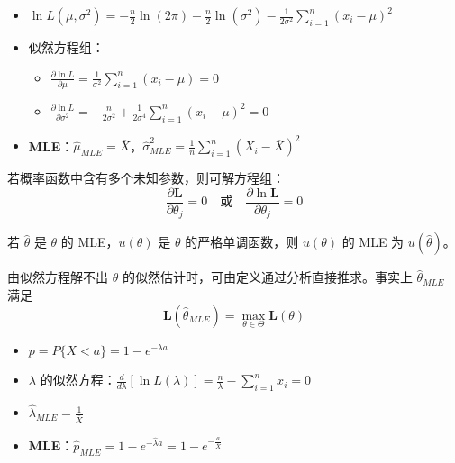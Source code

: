 \begin{example}
\begin{itemize}
	\item $\ln L(\mu, \sigma^2) = -\frac{n}{2}\ln(2\pi) - \frac{n}{2}\ln(\sigma^{2}) - \frac{1}{2\sigma^{2}}\sum_{i=1}^{n}(x_{i}-\mu)^{2}$
	\item 似然方程组：
	\begin{itemize}
		\item $\frac{\partial \ln L}{\partial \mu} = \frac{1}{\sigma^{2}}\sum_{i=1}^{n}(x_{i}-\mu) = 0$
		\item $\frac{\partial \ln L}{\partial \sigma^{2}} = -\frac{n}{2\sigma^{2}} + \frac{1}{2\sigma^{4}}\sum_{i=1}^{n}(x_{i}-\mu)^{2} = 0$
	\end{itemize}
	\item \textbf{MLE}：$\hat{\mu}_{MLE} = \overline{X}$，$\hat{\sigma}^{2}_{MLE} = \frac{1}{n}\sum_{i=1}^{n}(X_{i}-\overline{X})^{2}$
\end{itemize}
\end{example}

\begin{note}
若概率函数中含有多个未知参数，则可解方程组：
\begin{equation}
	\frac{\partial \boldsymbol{L}}{\partial \theta_j}=0 \quad \text{或} \quad \frac{\partial \ln \boldsymbol{L}}{\partial \theta_j}=0
	\label{eq:MLE:方程组}
\end{equation}
\end{note}

\begin{theorem}
若 $\hat{\theta}$ 是 $\theta$ 的 MLE，$u(\theta)$ 是 $\theta$ 的严格单调函数，则 $u(\theta)$ 的 MLE 为 $u(\hat{\theta})$。
\end{theorem}

\begin{note}
由似然方程解不出 $\theta$ 的似然估计时，可由定义通过分析直接推求。事实上 $\hat{\theta}_{MLE}$ 满足
\begin{equation}
	\boldsymbol{L}(\hat{\theta}_{MLE})=\max_{\theta \in \Theta}\boldsymbol{L}(\theta)
	\label{eq:MLE:直接推求}
\end{equation}
\end{note}

\begin{example}[指数分布 $E(\lambda)$：求 $p=P\{X<a\}$ 的 MLE]
\begin{itemize}
	\item $p = P\{X<a\} = 1 - e^{-\lambda a}$
	\item $\lambda$ 的似然方程：$\frac{d}{d\lambda}[\ln L(\lambda)] = \frac{n}{\lambda} - \sum_{i=1}^{n}x_{i} = 0$
	\item $\hat{\lambda}_{MLE} = \frac{1}{\overline{X}}$
	\item \textbf{MLE}：$\hat{p}_{MLE} = 1 - e^{-\hat{\lambda}a} = 1 - e^{-\frac{a}{\overline{X}}}$
\end{itemize}
\end{example}


